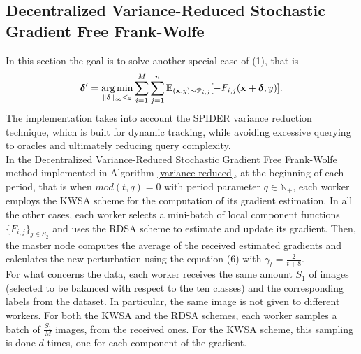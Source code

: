 \subsection{Decentralized Variance-Reduced Stochastic Gradient Free Frank-Wolfe}
In this section the goal is to solve another special case of (1), that is
\begin{equation}
	\mbox{\boldmath$ \delta$}' = \operatorname*{arg\,min}_{\lVert \mbox{\boldmath$\scriptstyle \delta$}\rVert_{\infty}\leq\varepsilon} \sum_{i=1}^M \sum_{j=1}^n \mathbb{E}_{(\mathbf{x},y)\sim \mathcal{P}_{i,j}}[- F_{i,j}(\mathbf{x}+\mbox{\boldmath$ \delta$},y)].
\end{equation}
The implementation takes into account the SPIDER variance reduction technique, which is built for dynamic tracking, while avoiding excessive querying to oracles and ultimately reducing query complexity.\\
\indent In the Decentralized Variance-Reduced Stochastic Gradient Free Frank-Wolfe method implemented in Algorithm \ref{variance-reduced},
at the beginning of each period, that is when $mod(t,q)=0$ with period parameter $q \in \mathbb{N}_{+}$, each worker employs the KWSA scheme for the computation of its gradient estimation. In all the other cases, each worker selects a mini-batch of local component functions $\{F_{i,j}\}_{j\in S_2}$ and uses the RDSA scheme to estimate and update its gradient. Then, the master node computes the average of the received estimated gradients and calculates the new perturbation using the equation (6) with $\gamma_t = \frac{2}{t+8}$.\\
\indent For what concerns the data, each worker receives the same amount $S_1$ of images (selected to be balanced with respect to the ten classes) and the corresponding labels from the dataset. In particular, the same image is not given to different workers. For both the KWSA and the RDSA schemes, each worker samples a batch of $\frac{S_1}{M}$ images, from the received ones. For the KWSA scheme, this sampling is done $d$ times, one for each component of the gradient.  
